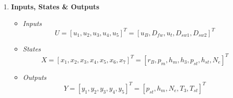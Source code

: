 \documentclass[11pt, a4paper, fleqn]{article}
\begin{document}
\begin{enumerate}
 \item \textbf{Inputs, States \& Outputs}
\begin{itemize}
	\item \textit{Inputs}
	\begin{equation*}
		U = [u_1,u_2,u_3,u_4,u_5]^T = [u_B, D_{fw}, u_t, D_{sw1}, D_{sw2}]^T
	\end{equation*}
	\item \textit{States}
	\begin{equation*}
		X = [x_1,x_2,x_3,x_4,x_5,x_6,x_7]^T = [r_B, p_m,h_m,h_3,p_{st},h_{st},N_e]^T
	\end{equation*}	
	\item \textit{Outputs}
	\begin{equation*}
		Y = [y_1,y_2,y_3,y_4,y_5]^T = [p_{st},h_m,N_e,T_3,T_{st}]^T
	\end{equation*}	
\end{itemize}


\end{enumerate}
\end{document}
